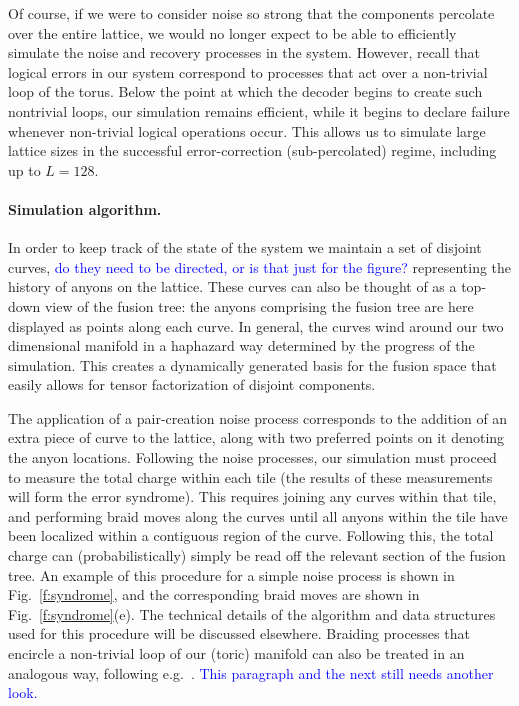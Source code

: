 \documentclass[aps, prl, letterpaper, twocolumn, superscriptaddress, notitlepage, 10pt]{revtex4-1}
\newcommand{\Fref}[1]{Fig.~\ref{#1}}
\newcommand{\cggb}[1]{\textcolor{blue}{#1}}
\begin{document}
Of course, if we were to consider noise so strong that 
the components percolate over the entire lattice, we would no 
longer expect to be able to efficiently simulate the noise and recovery processes in the system. 
However, recall that logical errors in our system correspond to processes that act over a non-trivial loop of the torus. 
Below the point at which the decoder begins to create such nontrivial loops, our simulation remains efficient,
while it begins to declare failure whenever non-trivial logical 
operations occur. This allows us to simulate large lattice sizes 
in the successful error-correction (sub-percolated) regime, including up to $L=128$.

\paragraph{Simulation algorithm.}


In order to keep track of the state of the system we maintain a set of disjoint curves, 
\cggb{do they need to be directed, or is that just for the figure?} 
representing the history of anyons on the lattice.
These curves can also be thought of as a top-down view of the fusion tree:
the anyons comprising the fusion tree are here displayed as points along each curve. 
In general, the curves wind around our two 
dimensional manifold in a haphazard way determined by the progress of the simulation.
This creates a dynamically generated basis for the fusion space that easily allows for tensor factorization of disjoint components. 

The application of a pair-creation noise process corresponds to the addition of an extra piece of curve to the lattice, along with two preferred points on it denoting the anyon locations. 
Following the noise processes, our simulation must proceed to measure the total charge within each tile (the results of these measurements will form the error syndrome). 
This requires joining any curves within that tile, and performing braid moves along the curves until all anyons within the tile have been localized within a contiguous region of the curve. 
Following this, the total charge can (probabilistically) simply be read off the relevant section of the fusion tree.
An example of this procedure for a simple noise process is shown in \Fref{f:syndrome}, and the corresponding braid moves are shown in \Fref{f:syndrome}(e). The technical details of the algorithm and data structures used for this procedure will be discussed elsewhere.
Braiding processes that encircle a non-trivial loop of our (toric) manifold can also be treated in an analogous way, following e.g.~\cite{Pfeifer2012}.
\cggb{This paragraph and the next still needs another look.}
\end{document}
